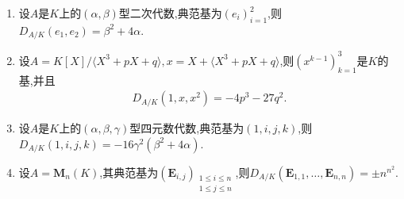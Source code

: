 \begin{example}{}{}
	\begin{enumerate}
		\item 设$A$是$K$上的$\left(\alpha,\beta\right)$型二次代数,典范基为$\left(e_{i}\right)_{i=1}^{2}$,则$D_{A/K}\left(e_{1},e_{2}\right)=\beta^{2}+4\alpha$.
		\item 设$A=K\left[X\right]/\langle X^{3}+pX+q\rangle,x=X+\langle X^{3}+pX+q\rangle$,则$\left(x^{k-1}\right)_{k=1}^{3}$是$K$的基,并且
		\begin{align*}
			D_{A/K}\left(1,x,x^{2}\right)=-4p^{3}-27q^{2}.
		\end{align*}
		\item 设$A$是$K$上的$\left(\alpha,\beta,\gamma\right)$型四元数代数,典范基为$\left(1,i,j,k\right)$,则$D_{A/K}\left(1,i,j,k\right)=-16\gamma^{2}\left(\beta^{2}+4\alpha\right)$.
		\item 设$A=\mathbf{M}_{n}\left(K\right)$,其典范基为$\left(\boldsymbol{E}_{i,j}\right)_{\substack{1\leq i\leq n\\1\leq j\leq n}}$,则$D_{A/K}\left(\boldsymbol{E}_{1,1},\ldots,\boldsymbol{E}_{n,n}\right)=\pm n^{n^{2}}$.
	\end{enumerate}
\end{example}









































